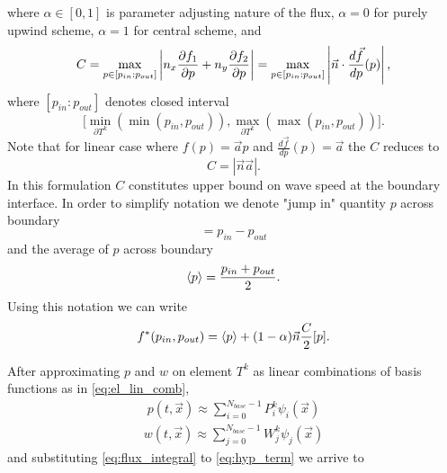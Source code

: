 where $\alpha \in [0, 1]$ is parameter adjusting nature of the flux, $\alpha = 0$ for purely upwind scheme, 
$\alpha = 1$ for central scheme,  and
\begin{equation}
    C = \max_{p \in [p_{in} : p_{out}]} \left\lvert n_x \frac{\partial f_1}{\partial p} + n_y \frac{\partial f_2}{\partial p}\right\rvert =
        \max_{p \in [p_{in} : p_{out}]} \left\lvert\vec{n}\cdot\frac{d\vec{f}}{dp}(p)\right\rvert,
\end{equation}
where $[p_{in} : p_{out}]$ denotes closed interval 
$$\big[\min_{\partial{T^k}} (\min(p_{in}, p_{out})), 
       \max_{\partial{T^k}}(\max(p_{in}, p_{out}))\big].$$ 
Note that for linear case where $f(p) = \vec{a}p$ and $\frac{d\vec{f}}{dp}(p) = \vec{a}$  
the $C$ reduces to
\begin{equation}
    C = |\vec{n}\vec{a}|.
\end{equation}
In this formulation $C$ constitutes upper bound on wave speed at the boundary interface.
In order to simplify notation we denote "jump in" 
quantity $p$ across boundary 
\begin{equation}
    [p] = p_{in} - p_{out}
\end{equation}
and the average of $p$ across boundary  
\begin{equation}
    \label{eq:avrg}
    \langle p\rangle = \frac{p_{in}+p_{out}}{2}.
\end{equation}
Using this notation we can write
\begin{equation}
    f^*(p_{in}, p_{out}) = \langle p\rangle + (1-\alpha) \vec{n}\frac{C}{2}[p].
\end{equation}



After approximating $p$ and $w$ on element $T^k$ as linear combinations of 
basis functions as in 
\eqref{eq:el_lin_comb},
\begin{align}\label{eq:state_epprox}
    p(t, \vec{x}) \approx \sum\limits_{i=0}^{N_{base}-1} P_i^k\psi_i(\vec{x})
\end{align}
\begin{align}\label{eq:test_approx}
    w(t, \vec{x}) \approx \sum\limits_{j=0}^{N_{base}-1} W_j^k\psi_j(\vec{x})
\end{align}
and substituting \eqref{eq:flux_integral} to \eqref{eq:hyp_term} we arrive to 


